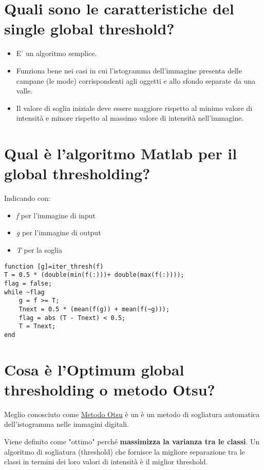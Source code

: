 \section{Quali sono le caratteristiche del single global threshold?}
\begin{itemize}
\item E' un algoritmo semplice.
\item Funziona bene nei casi in cui l'istogramma dell'immagine presenta delle campane (le mode) corrispondenti agli oggetti e allo sfondo separate da una valle.
\item Il valore di soglia iniziale deve essere maggiore rispetto al minimo valore di intensità e minore rispetto al massimo valore di intensità nell'immagine.
\end{itemize}

\section{Qual è l'algoritmo Matlab per il global thresholding?}
Indicando con:

\begin{itemize}
\item \textit{f} per l'immagine di input
\item \textit{g} per l'immagine di output
\item \textit{T} per la soglia
\end{itemize}

\begin{lstlisting}
function [g]=iter_thresh(f)
T = 0.5 * (double(min(f(:)))+ double(max(f(:))));
flag = false;
while ~flag
	g = f >= T;
	Tnext = 0.5 * (mean(f(g)) + mean(f(~g)));
	flag = abs (T - Tnext) < 0.5;
	T = Tnext;
end
\end{lstlisting}

\section{Cosa è l'Optimum global thresholding o metodo Otsu?} 
Meglio conosciuto come \href{https://en.wikipedia.org/wiki/Otsu\%27s_method}{Metodo Otsu} è un è un metodo di sogliatura automatica dell'istogramma nelle immagini digitali.

Viene definito come "ottimo" perché \textbf{massimizza la varianza tra le classi}. Un algoritmo di sogliatura (threshold) che fornisce la migliore separazione tra le classi in termini dei loro valori di intensità è il miglior threshold.

